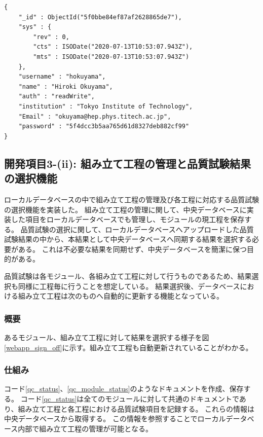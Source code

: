 \begin{lstlisting}[basicstyle=\scriptsize,caption=ウェブアプリケーションで扱うユーザ情報を持つドキュメントの例。リスト\ref{user_doc_1}で示したものとは別に、ウェブアプリケーション内でユーザ情報を扱うためにこのドキュメントを保持する必要がある。ウェブにおいてログインはこのドキュメントの存在確認をもってなされる。パスワードはハッシュ化して保存している。,label=user_doc_2]
{
	"_id" : ObjectId("5f0bbe84ef87af2628865de7"),
	"sys" : {
		"rev" : 0,
		"cts" : ISODate("2020-07-13T10:53:07.943Z"),
		"mts" : ISODate("2020-07-13T10:53:07.943Z")
	},
	"username" : "hokuyama",
	"name" : "Hiroki Okuyama",
	"auth" : "readWrite",
	"institution" : "Tokyo Institute of Technology",
	"Email" : "okuyama@hep.phys.titech.ac.jp",
	"password" : "5f4dcc3b5aa765d61d8327deb882cf99"
}
\end{lstlisting}

\clearpage
\newpage
\subsection{開発項目3-(ii): 組み立て工程の管理と品質試験結果の選択機能}\label{sec:stage_management_function}
ローカルデータベースの中で組み立て工程の管理及び各工程に対応する品質試験の選択機能を実装した。
組み立て工程の管理に関して、中央データベースに実装した項目をローカルデータベースでも管理し、モジュールの現工程を保存する。
品質試験の選択に関して、ローカルデータベースへアップロードした品質試験結果の中から、本結果として中央データベースへ同期する結果を選択する必要がある。
これは不必要な結果を同期せず、中央データベースを簡潔に保つ目的がある。

品質試験は各モジュール、各組み立て工程に対して行うものであるため、結果選択も同様に工程毎に行うことを想定している。
結果選択後、データベースにおける組み立て工程は次のものへ自動的に更新する機能となっている。

\subsubsection{概要}
あるモジュール、組み立て工程に対して結果を選択する様子を図\ref{webapp_sign_off}に示す。組み立て工程も自動更新されていることがわかる。

\subsubsection{仕組み}
コード\ref{qc_status}、\ref{qc_module_status}のようなドキュメントを作成、保存する。
コード\ref{qc_status}は全てのモジュールに対して共通のドキュメントであり、組み立て工程と各工程における品質試験項目を記録する。
これらの情報は中央データベースから取得する。
この情報を参照することでローカルデータベース内部で組み立て工程の管理が可能となる。

